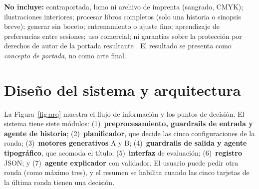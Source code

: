 \documentclass[10pt,a4paper,twocolumn]{article}
\begin{document}
\textbf{No incluye:} contraportada, lomo ni archivo de imprenta (sangrado, CMYK); ilustraciones interiores; procesar libros completos (solo una historia o sinopsis breve); generar sin boceto; entrenamiento o ajuste fino; aprendizaje de preferencias entre sesiones; uso comercial; ni garantías sobre la protección por derechos de autor de la portada resultante \citep{usco2025}. El resultado se presenta como \emph{concepto de portada}, no como arte final.

\section{Diseño del sistema y arquitectura}\label{sec:arq}
La Figura~\ref{fig:arq} muestra el flujo de información y los puntos de decisión. El sistema tiene siete módulos:
(1)~\textbf{preprocesamiento, guardrails de entrada y agente de historia};
(2)~\textbf{planificador}, que decide las cinco configuraciones de la ronda;
(3)~\textbf{motores generativos} A y B;
(4)~\textbf{guardrails de salida y agente tipográfico}, que acomoda el título;
(5)~\textbf{interfaz} de evaluación;
(6)~\textbf{registro} JSON; y
(7)~\textbf{agente explicador} con validador.
El usuario puede pedir otra ronda (como máximo tres), y el resumen se habilita cuando las cinco tarjetas de la última ronda tienen una decisión.
\end{document}
